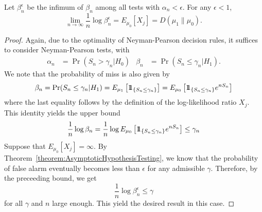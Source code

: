 \begin{theorem}[Stein]
Let $\beta^{\epsilon}_n$ be the infimum of $\beta_n$ among all tests with $\alpha_n < \epsilon$.
For any $\epsilon < 1$,
\begin{equation*}
\lim_{n \rightarrow \infty} \frac{1}{n} \log \beta_n^{\epsilon}
= E_{\mu_0} [ X_j ] = D ( \mu_1 \| \mu_0 ) .
\end{equation*}
\end{theorem}
\begin{proof}
Again, due to the optimality of Neyman-Pearson decision rules, it suffices to consider Neyman-Pearson tests, with
\begin{align*}
\alpha_n &= \Pr (S_n > \gamma_n | H_0) & \beta_n &= \Pr (S_n \leq \gamma_n | H_1) .
\end{align*}
We note that the probability of miss is also given by
\begin{equation*}
\beta_n = \Pr (S_n \leq \gamma_n | H_1)
= E_{\mu_1} \left[ \mathrm{1\!\!1}_{\{ S_n \leq \gamma_n \}} \right]
= E_{\mu_0} \left[ \mathrm{1\!\!1}_{\{ S_n \leq \gamma_n \}} e^{n S_n} \right]
\end{equation*}
where the last equality follows by the definition of the log-likelihood ratio $X_j$.
This identity yields the upper bound
\begin{equation*}
\frac{1}{n} \log \beta_n
= \frac{1}{n} \log E_{\mu_0} \left[ \mathrm{1\!\!1}_{\{ S_n \leq \gamma_n \}} e^{n S_n} \right]
\leq \gamma_n
\end{equation*}
Suppose that $E_{\mu_0} [X_j] = \infty$.
By Theorem~\ref{theorem:AsymptoticHypothesisTesting}, we know that the probability of false alarm eventually becomes less than $\epsilon$ for any admissible $\gamma$.
Therefore, by the preceeding bound, we get
\begin{equation*}
\frac{1}{n} \log \beta_n^{\epsilon} \leq \gamma
\end{equation*}
for all $\gamma$ and $n$ large enough.
This yield the desired result in this case.


\end{proof}
